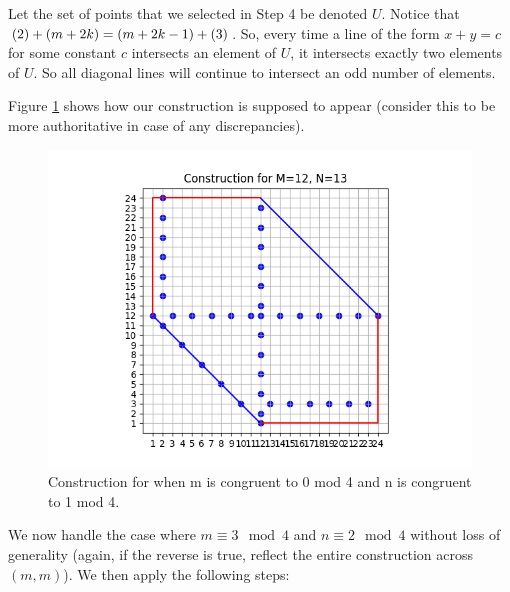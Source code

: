 \documentclass[10pt]{../usamts}
\begin{document}
\begin{solution}
\begin{enumerate}
    Let the set of points that we selected in Step 4 be denoted $U$. Notice that $\left( 2 \right)+\left( m+2k \right) = \left( m+2k-1 \right)+\left( 3 \right)$. So, every time a line of the form $x+y=c$ for some constant $c$ intersects an element of $U$, it intersects exactly two elements of $U$. So all diagonal lines will continue to intersect an odd number of elements.
\end{enumerate}
Figure \ref{fig:zerooneconstruct} shows how our construction is supposed to appear (consider this to be more authoritative in case of any discrepancies).

\begin{figure}[htbp]
\centering
    \includegraphics[width=12cm]{round2/p5construct/construct_12_13.png}
    \caption{Construction for when m is congruent to 0 mod 4 and n is congruent to 1 mod 4.}
    \label{fig:zerooneconstruct}
\end{figure}

\clearpage
We now handle the case where $m \equiv 3 \mod 4$ and $n \equiv 2 \mod 4$ without loss of generality (again, if the reverse is true, reflect the entire construction across $(m,m)$). We then apply the following steps:


\end{solution}
\end{document}
